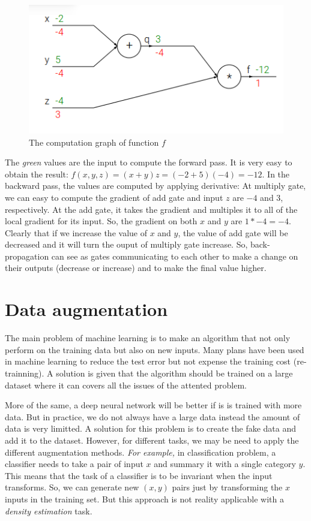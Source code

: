 \begin{figure}[h]
	\centering
	\includegraphics[scale=0.6]{images/back_ex}
	\caption{The computation graph of function $f$}
	\label{figbackex1}
\end{figure}
The \textit{green} values are the input to compute the forward pass. It is very easy to obtain the result: $f(x,y,z) = (x +y)z = (-2 + 5)(-4) = -12$. In the backward pass, the values are computed by applying derivative: At multiply gate, we can easy to compute the gradient of add gate and input $z$ are $-4$ and $3$, respectively. At the add gate, it takes the gradient and multiples it to all of the local gradient for its input. So, the gradient on both $x$ and $y$ are $1 \ast -4 = -4$. Clearly that if we increase the value of $x$ and $y$, the value of add gate will be decreased and it will turn the ouput of multiply gate increase. So, back-propagation can see as gates communicating to each other to make a change on their outputs (decrease or increase) and to make the final value higher.

\section{Data augmentation}

The main problem of machine learning is to make an algorithm that not only perform on the training data but also on new inputs. Many plans have been used in machine learning to reduce the test error but not expense the training cost (re-trainning). A solution is given that the algorithm should be trained on a large dataset where it can covers all the issues of the attented problem.

More of the same, a deep neural network will be better if is is trained with more data. But in practice, we do not always have a large data instead the amount of data is very limitted. A solution for this problem is to create the fake data and add it to the dataset. However, for different tasks, we may be need to apply the different augmentation methods. \textit{For example,} in classification problem, a classifier needs to take a pair of input $x$ and summary it with a single category $y$. This means that the task of a classifier is to be invariant when the input transforms. So, we can generate new $(x,y)$ pairs just by transforming the $x$ inputs in the training set. But this approach is not reality applicable with a \textit{density estimation} task.

